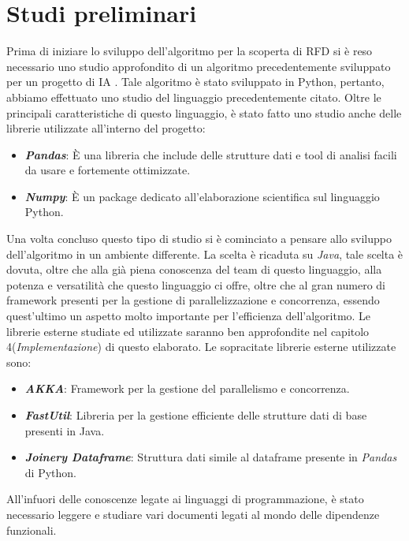 \section{Studi preliminari}
Prima di iniziare lo sviluppo dell'algoritmo per la scoperta di RFD si è reso necessario uno studio approfondito di un algoritmo precedentemente sviluppato per un progetto di IA \cite{tesinaIA}.
Tale algoritmo è stato sviluppato in Python, pertanto, abbiamo effettuato uno studio del linguaggio precedentemente citato.
Oltre le principali caratteristiche di questo linguaggio, è stato fatto uno studio anche delle librerie utilizzate all'interno del progetto:
\begin{itemize}
	\item \textbf{\emph{Pandas}}: È una libreria che include delle strutture dati e tool di analisi facili da usare e fortemente ottimizzate. 
	\item \textbf{\emph{Numpy}}: È un package dedicato all'elaborazione scientifica sul linguaggio Python.
\end{itemize}
Una volta concluso questo tipo di studio si è cominciato a pensare allo sviluppo dell'algoritmo in un ambiente differente.
La scelta è ricaduta su \emph{Java}, tale scelta è dovuta, oltre che alla già piena conoscenza del team di questo linguaggio, alla potenza e versatilità che questo linguaggio ci offre, oltre che al gran numero di framework presenti per la gestione di parallelizzazione e concorrenza, essendo quest'ultimo un aspetto molto importante per l'efficienza dell'algoritmo.
Le librerie esterne studiate ed utilizzate saranno ben approfondite nel capitolo 4(\emph{Implementazione}) di questo elaborato.
Le sopracitate librerie esterne utilizzate sono:
\begin{itemize}
	\item \textbf{\emph{AKKA}}: Framework per la gestione del parallelismo e concorrenza.
	\item \textbf{\emph{FastUtil}}: Libreria per la gestione efficiente delle strutture dati di base presenti in Java.
	\item \textbf{\emph{Joinery Dataframe}}: Struttura dati simile al dataframe presente in \emph{Pandas} di Python.
\end{itemize}
All'infuori delle conoscenze legate ai linguaggi di programmazione, è stato necessario leggere e studiare vari documenti legati al mondo delle dipendenze funzionali. 
